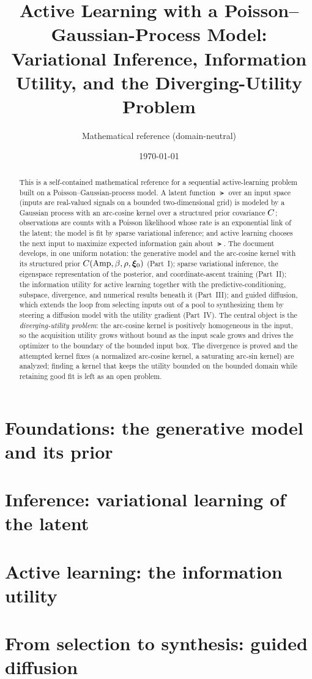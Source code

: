 \documentclass[11pt]{article}
\title{Active Learning with a Poisson--Gaussian-Process Model:\\[2pt]
\large Variational Inference, Information Utility, and the Diverging-Utility Problem}
\author{Mathematical reference (domain-neutral)}
\date{\today}
\begin{document}
\maketitle

\begin{abstract}
\noindent
This is a self-contained mathematical reference for a sequential active-learning
problem built on a Poisson--Gaussian-process model. A latent function $\lat$ over
an input space (inputs are real-valued signals on a bounded two-dimensional grid)
is modeled by a Gaussian process with an arc-cosine kernel over a structured prior
covariance $C$; observations are counts with a Poisson likelihood whose rate is
an exponential link of the latent; the model is fit by sparse variational
inference; and active learning chooses the next input to maximize expected
information gain about $\lat$. The document develops, in one uniform notation: the
generative model and the arc-cosine kernel with its structured prior
$C(\mathrm{Amp},\beta,\rho,\bm{\xi}_{0})$ (Part~I); sparse variational inference, the
eigenspace representation of the posterior, and coordinate-ascent training
(Part~II); the information utility for active learning together with the
predictive-conditioning, subspace, divergence, and numerical results beneath it
(Part~III); and guided diffusion, which extends the loop from selecting inputs out
of a pool to synthesizing them by steering a diffusion model with the utility
gradient (Part~IV). The central object is the \emph{diverging-utility problem}: the
arc-cosine kernel is positively homogeneous in the input, so the acquisition
utility grows without bound as the input scale grows and drives the optimizer to
the boundary of the bounded input box. The divergence is proved and the attempted
kernel fixes (a normalized arc-cosine kernel, a saturating arc-sin kernel) are
analyzed; finding a kernel that keeps the utility bounded on the bounded domain
while retaining good fit is left as an open problem.
\end{abstract}

\tableofcontents
\clearpage



\part{Foundations: the generative model and its prior}


\part{Inference: variational learning of the latent}



\part{Active learning: the information utility}



\part{From selection to synthesis: guided diffusion}


\appendix

\end{document}
